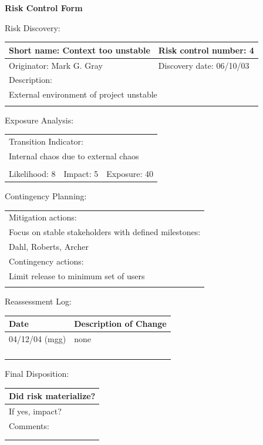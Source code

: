 \documentclass{article}
\begin{document}
\begin{center}\Large\bf
Risk Control Form
\end{center}
\vspace{24pt}

Risk Discovery:

\begin{tabular}{|p{211pt}|p{211pt}|} \hline
Short name: Context too unstable & Risk control number: 4 \\ \hline
Originator: Mark G. Gray & Discovery date: 06/10/03 \\ \hline
\multicolumn{2}{|l|}{Description:} \\
\multicolumn{2}{|l|}{External environment of project unstable} \\
\multicolumn{2}{|l|}{\mbox{}} \\ \hline
\end{tabular}
\vspace{24pt}

Exposure Analysis:

\begin{tabular}{|p{138pt}|p{138pt}|p{138pt}|} \hline
\multicolumn{3}{|l|}{Transition Indicator:} \\
\multicolumn{3}{|l|}{Internal chaos due to external chaos} \\
\multicolumn{3}{|l|}{\mbox{}} \\ \hline
Likelihood: 8 & Impact: 5 & Exposure: 40\\ \hline
\end{tabular}
\vspace{24pt}

Contingency Planning:

\begin{tabular}{|p{433pt}|} \hline
Mitigation actions: \\
Focus on stable stakeholders with defined milestones: \\
Dahl, Roberts, Archer \\ \hline
Contingency actions: \\
Limit release to minimum set of users \\
\mbox{} \\ \hline
\end{tabular}
\vspace{24pt}

Reassessment Log:

\begin{tabular}{|p{72pt}|p{351pt}|} \hline
Date & Description of Change \\ \hline
04/12/04 (mgg) & none \\ \hline
\mbox{} & \mbox{} \\ \hline
\mbox{} & \mbox{} \\ \hline
\mbox{} & \mbox{} \\ \hline
\mbox{} & \mbox{} \\ \hline
\end{tabular}
\vspace{24pt}

Final Disposition:

\begin{tabular}{|p{433pt}|} \hline
Did risk materialize? \\ \hline
If yes, impact? \\ \hline
Comments: \\
\mbox{} \\
\mbox{} \\ \hline
\end{tabular}
\end{document}

